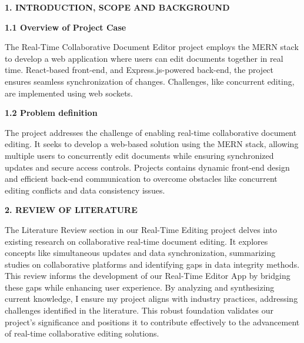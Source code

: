 \documentclass{article}
\begin{document}
\newpage

\begin{center}
    \LARGE\bfseries 1. INTRODUCTION, SCOPE AND BACKGROUND\\
\end{center}

{\Large\bfseries 1.1 Overview of Project Case \\}

{\normalsize  The Real-Time Collaborative Document Editor project employs the MERN stack to develop a web application where users can edit documents together in real time. React-based front-end, and Express.js-powered back-end, the project ensures seamless synchronization of changes. Challenges, like concurrent editing, are implemented using web sockets.}

\vspace{25pt}
{\Large\bfseries 1.2 Problem definition \\}

{\normalsize  
The project addresses the challenge of enabling real-time collaborative document editing. It seeks to develop a web-based solution using the MERN stack, allowing multiple users to concurrently edit documents while ensuring synchronized updates and secure access controls. Projects contains dynamic front-end design and efficient back-end communication to overcome obstacles like concurrent editing conflicts and data consistency issues.}


\vspace{25pt}




\newpage

\begin{center}
    \LARGE\bfseries 2. REVIEW OF LITERATURE\\
\end{center}



{\normalsize  The Literature Review section in our Real-Time Editing project delves into existing research on collaborative real-time document editing. It explores concepts like simultaneous updates and data synchronization, summarizing studies on collaborative platforms and identifying gaps in data integrity methods. This review informs the development of our Real-Time Editor App by bridging these gaps while enhancing user experience. By analyzing and synthesizing current knowledge, I ensure my project aligns with industry practices, addressing challenges identified in the literature. This robust foundation validates our project's significance and positions it to contribute effectively to the advancement of real-time collaborative editing solutions.}
\end{document}
